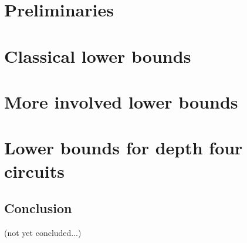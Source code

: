 






\tableofcontents



\part{Preliminaries}










\part{Classical lower bounds}





\part{More involved lower bounds}





\part{Lower bounds for depth four circuits}





\chapter{Conclusion}

(not yet concluded...)




